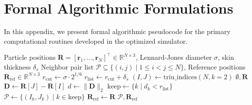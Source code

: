 \documentclass[12pt,a4paper]{article}
\begin{document}
\section{Formal Algorithmic Formulations}
\label{app:algorithms}

In this appendix, we present formal algorithmic pseudocode for the primary
computational routines developed in the optimized simulator.

\begin{algorithm}[H]
\caption{Dynamic Verlet Neighbor List Construction with Displacement Guard}
\label{alg:verlet}
\begin{algorithmic}[1]
\Require Particle positions $\mathbf{R} = [\mathbf{r}_1, \ldots, \mathbf{r}_N]^\top \in \mathbb{R}^{N \times 3}$, Lennard-Jones diameter $\sigma$, skin thickness $\delta_s$
\Ensure Neighbor pair list $\mathcal{P} \subseteq \{(i,j) \mid 1 \leq i < j \leq N\}$, Reference positions $\mathbf{R}_\text{ref} \in \mathbb{R}^{N \times 3}$
\State $r_\text{cut} \gets \sigma \cdot 2^{1/6}$
\State $r_\text{list} \gets r_\text{cut} + \delta_s$
\State $(I, J) \gets \mathrm{triu\_indices}(N, k=2)$ 
    \State \Return $\emptyset, \mathbf{R}$
\EndIf
\State $\mathbf{D} \gets \mathbf{R}[J] - \mathbf{R}[I]$ 
\State $d \gets \|\mathbf{D}\|_2$ 
\State $\mathrm{keep} \gets \{k \mid d_k < r_\text{list}\}$
\State $\mathcal{P} \gets \{(I_k, J_k) \mid k \in \mathrm{keep}\}$
\State $\mathbf{R}_\text{ref} \gets \mathbf{R}$
\State \Return $\mathcal{P}, \mathbf{R}_\text{ref}$
\end{algorithmic}
\end{algorithm}
\end{document}
